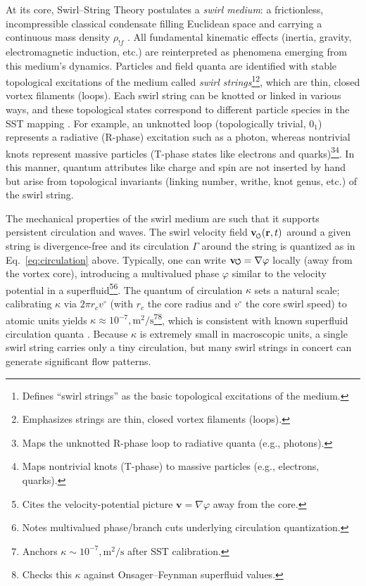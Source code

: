 \documentclass[12pt]{article}
\DeclareRobustCommand{\swirlarrow}{
\mathchoice{\mkern-2mu\scriptstyle\boldsymbol{\circlearrowleft}}%
{\mkern-2mu\scriptstyle\boldsymbol{\circlearrowleft}}%
{\mkern-2mu\scriptscriptstyle\boldsymbol{\circlearrowleft}}%
{\mkern-2mu\scriptscriptstyle\boldsymbol{\circlearrowleft}}
}%
\begin{document}
At its core, Swirl--String Theory postulates a \emph{swirl medium}: a frictionless, incompressible classical condensate filling Euclidean space and carrying a continuous mass density $\rho_{!f}$ \cite{Iskandarani2025Canon}. All fundamental kinematic effects (inertia, gravity, electromagnetic induction, etc.) are reinterpreted as phenomena emerging from this medium’s dynamics. Particles and field quanta are identified with stable topological excitations of the medium called \emph{swirl strings}\footnote{Defines ``swirl strings'' as the basic topological excitations of the medium.}\footnote{Emphasizes strings are thin, closed vortex filaments (loops).}, which are thin, closed vortex filaments (loops). Each swirl string can be knotted or linked in various ways, and these topological states correspond to different particle species in the SST mapping \cite{Iskandarani2025Canon}. For example, an unknotted loop (topologically trivial, $0_1$) represents a radiative (R-phase) excitation such as a photon, whereas nontrivial knots represent massive particles (T-phase states like electrons and quarks)\footnote{Maps the unknotted R-phase loop to radiative quanta (e.g., photons).}\footnote{Maps nontrivial knots (T-phase) to massive particles (e.g., electrons, quarks).}. In this manner, quantum attributes like charge and spin are not inserted by hand but arise from topological invariants (linking number, writhe, knot genus, etc.) of the swirl string.


The mechanical properties of the swirl medium are such that it supports persistent circulation and waves. The swirl velocity field $\mathbf{v}_{\swirlarrow}(\mathbf{r},t)$ around a given string is divergence-free and its circulation $\Gamma$ around the string is quantized as in Eq.~\eqref{eq:circulation} above. Typically, one can write $\mathbf{v}{\swirlarrow} = \nabla \varphi$ locally (away from the vortex core), introducing a multivalued phase $\varphi$ similar to the velocity potential in a superfluid\footnote{Cites the velocity-potential picture $\mathbf v=\nabla\varphi$ away from the core.}\footnote{Notes multivalued phase/branch cuts underlying circulation quantization.}. The quantum of circulation $\kappa$ sets a natural scale; calibrating $\kappa$ via $2\pi r_c v^{\circ}$ (with $r_c$ the core radius and $v^{\circ}$ the core swirl speed) to atomic units yields $\kappa \approx 10^{-7},\mathrm{m}^2/\mathrm{s}$\footnote{Anchors $\kappa\sim10^{-7},\mathrm{m^2/s}$ after SST calibration.}\footnote{Checks this $\kappa$ against Onsager–Feynman superfluid values.}, which is consistent with known superfluid circulation quanta \cite{Onsager1949,Feynman1955}. Because $\kappa$ is extremely small in macroscopic units, a single swirl string carries only a tiny circulation, but many swirl strings in concert can generate significant flow patterns.
\end{document}
